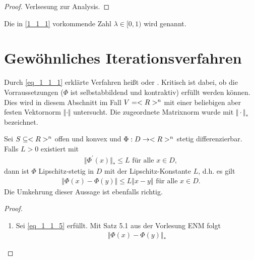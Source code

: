 \begin{proof}
	Verlsesung zur Analysis.
\end{proof}

Die in \ref{1_1_1} vorkommende Zahl $\lambda \in [0,1)$ wird  genannt. 

\section{Gewöhnliches Iterationsverfahren}

Durch \ref{eq_1_1_1} erklärte Verfahren heißt  oder . Kritisch ist dabei, ob die Vorraussetzungen ($\Phi$ ist selbstabbildend und kontraktiv) erfüllt werden können. Dies wird in diesem Abschnitt im Fall $V = <R>^n$ mit einer beliebigen aber festen Vektornorm $\Vert \cdot \Vert$ untersucht. Die zugeordnete Matrixnorm wurde mit $\Vert \cdot \Vert_{\ast}$ bezeichnet.

\begin{lemma}
	Sei $S \subseteq <R>^n$ offen und konvex und $\Phi: D \to <R>^n$ stetig differenzierbar. Falls $L > 0$ existiert mit
	\begin{align}
		\Vert \Phi^{'}(x) \Vert_{\ast} \le L \text{ für alle } x \in D, \label{eq_1_1_5}
	\end{align}
	dann ist $\Phi$ Lipschitz-stetig in $D$ mit der Lipschitz-Konstante $L$, d.h. es gilt
	\begin{align}
		\Vert \Phi(x) - \Phi(y)\Vert \le L \Vert x-y \Vert \text{ für alle } x \in D. \label{eq_1_1_6}
	\end{align}
	Die Umkehrung dieser Aussage ist ebenfalls richtig.
\end{lemma}

\begin{proof}
	\begin{enumerate}
		\item Sei \ref{eq_1_1_5} erfüllt. Mit Satz 5.1 aus der Vorlesung ENM folgt
		\begin{align}
		\Vert \Phi(x) - \Phi(y) \Vert_{\ast}
		\end{align}
	\end{enumerate}
\end{proof}